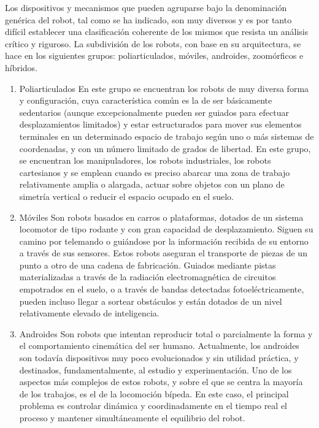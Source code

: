 Los dispositivos y mecanismos que pueden agruparse bajo la denominación genérica del robot, tal como se ha indicado, son muy diversos y es por tanto difícil establecer una clasificación coherente de los mismos que resista un análisis crítico y riguroso. La subdivisión de los robots, con base en su arquitectura, se hace en los siguientes grupos: poliarticulados, móviles, androides, zoomórficos e híbridos.

\begin{enumerate}
	\itemsep1pt \parskip1pt 
	\item Poliarticulados
	En este grupo se encuentran los robots de muy diversa forma y configuración, cuya característica común es la de ser básicamente sedentarios (aunque excepcionalmente pueden ser guiados para efectuar desplazamientos limitados) y estar estructurados para mover sus elementos terminales en un determinado espacio de trabajo según uno o más sistemas de coordenadas, y con un número limitado de grados de libertad. En este grupo, se encuentran los manipuladores, los robots industriales, los robots cartesianos y se emplean cuando es preciso abarcar una zona de trabajo relativamente amplia o alargada, actuar sobre objetos con un plano de simetría vertical o reducir el espacio ocupado en el suelo.

	\item Móviles
	Son robots basados en carros o plataformas, dotados de un sistema locomotor de tipo rodante y con gran capacidad de desplazamiento. Siguen su camino por telemando o guiándose por la información recibida de su entorno a través de sus sensores. Estos robots aseguran el transporte de piezas de un punto a otro de una cadena de fabricación. Guiados mediante pistas materializadas a través de la radiación electromagnética de circuitos empotrados en el suelo, o a través de bandas detectadas fotoeléctricamente, pueden incluso llegar a sortear obstáculos y están dotados de un nivel relativamente elevado de inteligencia.

	\item Androides
	Son robots que intentan reproducir total o parcialmente la forma y el comportamiento cinemática del ser humano. Actualmente, los androides son todavía dispositivos muy poco evolucionados y sin utilidad práctica, y destinados, fundamentalmente, al estudio y experimentación. Uno de los aspectos más complejos de estos robots, y sobre el que se centra la mayoría de los trabajos, es el de la locomoción bípeda. En este caso, el principal problema es controlar dinámica y coordinadamente en el tiempo real el proceso y mantener simultáneamente el equilibrio del robot.


\end{enumerate}
